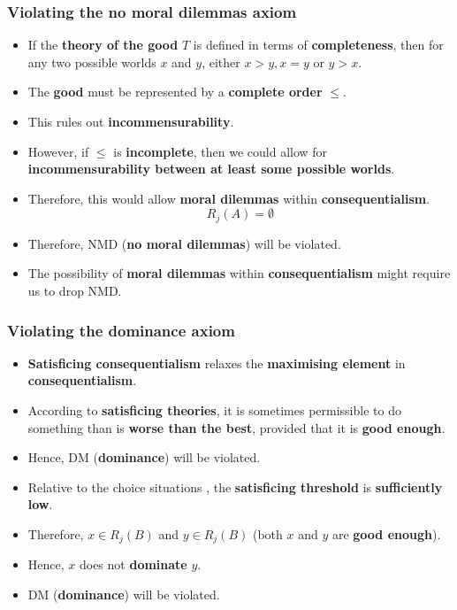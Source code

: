 \documentclass[11pt]{article}
\begin{document}
\subsubsection{Violating the no moral dilemmas axiom}
\label{sec:org0a5319b}
\begin{itemize}
\item If the \textbf{theory of the good} \(T\) is defined in terms of \textbf{completeness}, then for any two possible worlds \(x\) and \(y\), either \(x > y, x = y\) or \(y > x\).
\item The \textbf{good} must be represented by a \textbf{complete order} \(\le\).
\item This rules out \textbf{incommensurability}.
\item However, if \(\le\) is \textbf{incomplete}, then we could allow for \textbf{incommensurability between at least some possible worlds}.
\item Therefore, this would allow \textbf{moral dilemmas} within \textbf{consequentialism}.
\[R_j (A) = \emptyset\]
\item Therefore, NMD (\textbf{no moral dilemmas}) will be violated.
\item The possibility of \textbf{moral dilemmas} within \textbf{consequentialism} might require us to drop NMD.
\end{itemize}

 \newpage
\subsubsection{Violating the dominance axiom}
\label{sec:org82bc7ac}
\begin{itemize}
\item \textbf{Satisficing consequentialism} relaxes the \textbf{maximising element} in \textbf{consequentialism}.
\item According to \textbf{satisficing theories}, it is sometimes permissible to do something than is \textbf{worse than the best}, provided that it is \textbf{good enough}.
\item Hence, DM (\textbf{dominance}) will be violated.
\item Relative to the choice situations \(<j, B>\), the \textbf{satisficing threshold} is \textbf{sufficiently low}.
\item Therefore, \(x \in R_j (B)\) and \(y \in R_j (B)\) (both \(x\) and \(y\) are \textbf{good enough}).
\item Hence, \(x\) does not \textbf{dominate} \(y\).
\item DM (\textbf{dominance}) will be violated.
\end{itemize}
\end{document}
